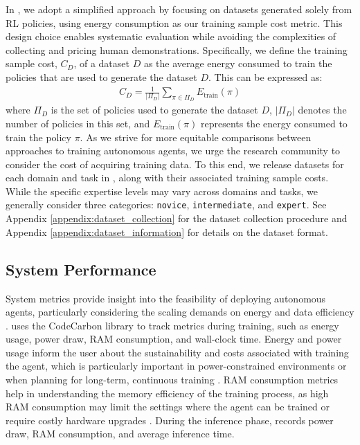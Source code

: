 In \method, we adopt a simplified approach by focusing on datasets generated solely from RL policies, using energy consumption as our training sample cost metric. This design choice enables systematic evaluation while avoiding the complexities of collecting and pricing human demonstrations. Specifically, we define the training sample cost, $C_D$, of a dataset $D$ as the average energy consumed to train the policies that are used to generate the dataset $D$. This can be expressed as:
\begin{align}
C_D = \frac{1}{|\Pi_D|} \sum_{\pi \in \Pi_D} E_{\text{train}}(\pi)
\end{align}where $\Pi_D$ is the set of policies used to generate the dataset $D$, $|\Pi_D|$ denotes the number of policies in this set, and $E_{\text{train}}(\pi)$ represents the energy consumed to train the policy $\pi$.
As we strive for more equitable comparisons between approaches to training autonomous agents, we urge the research community to consider the cost of acquiring training data. To this end, we release datasets for each domain and task in \method, along with their associated training sample costs.
While the specific expertise levels may vary across domains and tasks, we generally consider three categories: \texttt{novice}, \texttt{intermediate}, and \texttt{expert}.
See Appendix \ref{appendix:dataset_collection} for the dataset collection procedure and Appendix \ref{appendix:dataset_information} for details on the dataset format.

\subsection{System Performance}
\label{ssec:system_performance}
System metrics provide insight into the feasibility of deploying autonomous agents, particularly considering the scaling demands on energy and data efficiency \citep{frey2022benchmarking}. \method uses the CodeCarbon library \citep{codecarbon} to track metrics during training, such as energy usage, power draw, RAM consumption, and wall-clock time. Energy and power usage inform the user about the sustainability and costs associated with training the agent, which is particularly important in power-constrained environments or when planning for long-term, continuous training \citep{PARISI201954}. RAM consumption metrics help in understanding the memory efficiency of the training process, as high RAM consumption may limit the settings where the agent can be trained or require costly hardware upgrades \citep{li2023breaking}. During the inference phase, \method records power draw, RAM consumption, and average inference time.

